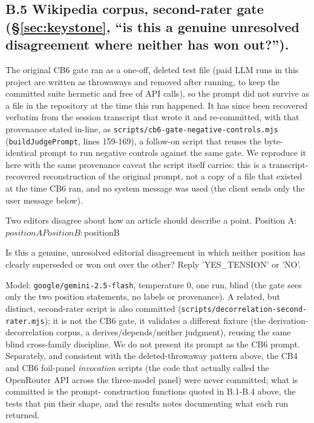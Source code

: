 \documentclass[11pt]{article}
\begin{document}
\subsection*{B.5 Wikipedia corpus, second-rater gate (\S\ref{sec:keystone}, ``is this a genuine unresolved disagreement where neither has won out?'').}
The original CB6 gate ran as a one-off, deleted test file (paid LLM runs in this project are
written as throwaways and removed after running, to keep the committed suite hermetic and
free of API calls), so the prompt did not survive as a file in the repository at the time
this run happened. It has since been recovered verbatim from the session transcript that
wrote it and re-committed, with that provenance stated in-line, as
\texttt{scripts/cb6-gate-negative-controls.mjs} (\texttt{buildJudgePrompt}, lines 159-169), a follow-on
script that reuses the byte-identical prompt to run negative controls against the same gate.
We reproduce it here with the same provenance caveat the script itself carries: this is a
transcript-recovered reconstruction of the original prompt, not a copy of a file that existed
at the time CB6 ran, and no system message was used (the client sends only the user message
below).

\begin{promptverb}
Two editors disagree about how an article should describe a point.
Position A: ${positionA}
Position B: ${positionB}

Is this a genuine, unresolved editorial disagreement in which neither position has
clearly superseded or won out over the other? Reply 'YES_TENSION' or 'NO'.
\end{promptverb}

Model: \texttt{google/gemini-2.5-flash}, temperature 0, one run, blind (the gate sees only the two
position statements, no labels or provenance). A related, but distinct, second-rater script
is also committed (\texttt{scripts/decorrelation-second-rater.mjs}); it is not the CB6 gate, it
validates a different fixture (the derivation-decorrelation corpus, a derives/depends/neither
judgment), reusing the same blind cross-family discipline. We do not present its prompt as
the CB6 prompt. Separately, and consistent with the deleted-throwaway pattern above, the
CB4 and CB6 foil-panel \emph{invocation} scripts (the code that actually called the OpenRouter API
across the three-model panel) were never committed; what is committed is the prompt-
construction functions quoted in B.1-B.4 above, the tests that pin their shape, and the
results notes documenting what each run returned.
\end{document}
